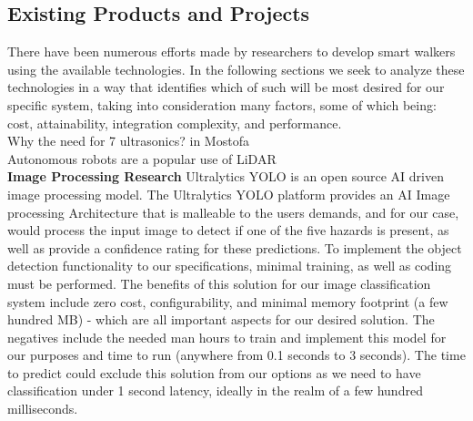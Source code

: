 \subsection{Existing Products and Projects}
\noindent There have been numerous efforts made by researchers to develop smart walkers using the available technologies. In the following sections we seek to analyze these technologies in a way that identifies which of such will be most desired for our specific system, taking into  consideration many factors, some of which being: cost, attainability, integration complexity, and performance.\\

\noindent Why the need for 7 ultrasonics? in Mostofa \cite{Mostofa}\\

\noindent Autonomous robots are a popular use of LiDAR\\

\noindent \textbf{Image Processing Research}
\newline
 Ultralytics YOLO is an open source AI driven image processing model. The Ultralytics YOLO platform provides an AI Image processing Architecture that is malleable to the users demands, and for our case, would process the input image to detect if one of the five hazards is present, as well as provide a confidence rating for these predictions. To implement the object detection functionality to our specifications, minimal training, as well as coding must be performed. The benefits of this solution for our image classification system include zero cost, configurability, and minimal memory footprint (a few hundred MB) - which are all important aspects for our desired solution. The negatives include the needed man hours to train and implement this model for our purposes and time to run (anywhere from 0.1 seconds to 3 seconds). The time to predict could exclude this solution from our options as we need to have classification under 1 second latency, ideally in the realm of a few hundred milliseconds. 
\newline 

